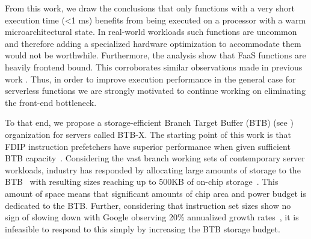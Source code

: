 \documentclass[../main.tex]{subfiles}
\begin{document}
\begin{refsection}[main-bib]

From this work, we draw the conclusions that only functions with
a very short execution time (<1 ms) benefits from being executed on a
processor with a warm microarchitectural state. In real-world
workloads such functions are
uncommon~\cite{shahrad20_server_wild,mahgoub22_wisef} and therefore
adding a specialized hardware optimization to accommodate them would
not be worthwhile. Furthermore, the analysis show that FaaS functions
are heavily frontend bound. This corroborates similar observations made
in previous work
\cite{lukewarm_serverless,gan19_open_sourc_bench_suite_micros}. Thus,
in order to improve execution performance in the general case for
serverless functions we are strongly motivated to continue working on
eliminating the front-end bottleneck.

To that end, we propose a
storage-efficient Branch Target Buffer (BTB) (see
) organization for servers called BTB-X.
The starting point of this work is that FDIP instruction prefetchers
have superior performance when given sufficient BTB
capacity~\cite{ishii21_re_fetch_direc_instr_prefet}. Considering the
vast branch working sets of contemporary server workloads, industry
has responded by allocating large amounts of storage to the
BTB~\cite{neoverse,IBMz,zen2} with resulting sizes reaching up to
500KB of on-chip storage~\cite{exynos}. This amount of space means
that significant amounts of chip area and power budget is dedicated to
the BTB. Further, considering that instruction set sizes show no sign
of slowing down with Google observing 20\% annualized growth
rates~\cite{kanev15_profil}, it is infeasible to respond to this
simply by increasing the BTB storage budget.


\end{refsection}
\end{document}
